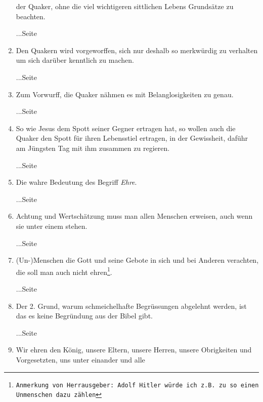 \begin{enumerate}
der Quaker, ohne die viel wichtigeren sittlichen Lebens Grundsätze zu beachten. 
 \begin{flushright}...Seite \pageref{ref:09_06_grundsaetze}\end{flushright}
 \item Den Quakern wird vorgeworffen, sich nur deshalb so merkwürdig zu
verhalten um sich darüber kenntlich zu machen. 
 \begin{flushright}...Seite \pageref{ref:09_07_vorwurff}\end{flushright}
 \item Zum Vorwurff, die Quaker nähmen es mit Belanglosigkeiten zu genau.
 \begin{flushright}...Seite \pageref{ref:09_08_vorwurff}\end{flushright}
 \item So wie Jesus dem Spott seiner Gegner ertragen hat, so wollen auch die
Quaker den Spott für ihren Lebensstiel ertragen, in der Gewissheit, daführ am
Jüngsten Tag mit ihm zusammen zu regieren.
 \begin{flushright}...Seite \pageref{ref:09_10_spott}\end{flushright}
 \item Die wahre Bedeutung des Begriff \textit{Ehre}.
 \begin{flushright}...Seite \pageref{ref:09_12_ehre}\end{flushright}
 \item Achtung und Wertschätzung muss man allen Menschen erweisen, auch wenn sie
unter einem stehen.
 \begin{flushright}...Seite \pageref{ref:09_18_ehre}\end{flushright}
 \item (Un-)Menschen die Gott und seine Gebote in sich und bei Anderen
verachten, die soll man auch nicht ehren\footnote{\texttt{Anmerkung von
Herrausgeber: Adolf Hitler würde ich z.B. zu so einen Unmenschen dazu zählen}}.
 \begin{flushright}...Seite \pageref{ref:09_19_ehre}\end{flushright}
 \item Der 2. Grund, warum schmeichelhafte Begrüssungen abgelehnt werden, ist
das es keine Begründung aus der Bibel gibt.
 \begin{flushright}...Seite \pageref{ref:09_20_zeiter_grund}\end{flushright}
 \item Wir ehren den König, unsere Eltern,
unsere Herren, unsere Obrigkeiten
und Vorgesetzten, uns unter einander und alle

\end{enumerate}
